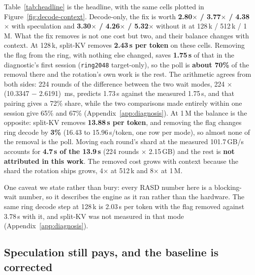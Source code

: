 \documentclass{article}
\begin{document}
Table~\ref{tab:headline} is the headline, with the same cells plotted in
Figure~\ref{fig:decode-context}. Decode-only, the fix is worth
\textbf{2.80$\times$ / 3.77$\times$ / 4.38$\times$} with speculation and
\textbf{3.30$\times$ / 4.26$\times$ / 5.32$\times$} without it at 128\,k / 512\,k / 1\,M.
What the fix removes is not one cost but two, and their balance changes with context.
At 128\,k, split-KV removes \textbf{2.43\,s per
token} on these cells. Removing the flag from the ring, with nothing else changed, saves
\textbf{1.75\,s} of that in the
diagnostic's first session (\texttt{ring2048} target-only), so the poll is \textbf{about 70\%}
of the removal there and the rotation's own work is the rest. The arithmetic agrees from both
sides: 224 rounds of the difference between the two wait modes,
224 $\times$ (10.3347 $-$ 2.6191)\,
ms, predicts 1.73\,s against the measured 1.75\,s, and that pairing gives a 72\% share, while the
two comparisons made
entirely within one session give 65\% and 67\% (Appendix~\ref{app:diagnosis}). At 1\,M the balance is the opposite: split-KV removes
\textbf{13.88\,s per token}, and removing the flag changes ring decode by \textbf{3\%} (16.43
to 15.96\,s/token, one row per mode), so almost none of the removal is the poll. Moving each round's
shard at the measured 101.7\,GB/s accounts for \textbf{4.7\,s of the 13.9\,s} (224 rounds
$\times$ 2.15\,GB) and the rest is \textbf{not attributed in this work}. The removed cost grows
with context because the shard the rotation ships grows, 4$\times$ at 512\,k and 8$\times$ at
1\,M.



One caveat we state rather than bury: every RASD number here is a blocking-wait number, so it
describes the engine as it ran rather than the hardware. The same ring decode step at 128\,k is
2.03\,s per token with the flag removed against 3.78\,s with it, and split-KV was not measured
in that mode (Appendix~\ref{app:diagnosis}).

\subsection{Speculation still pays, and the baseline is corrected}
\label{sec:res-spec}
\label{sec:res-seeds}
\end{document}
